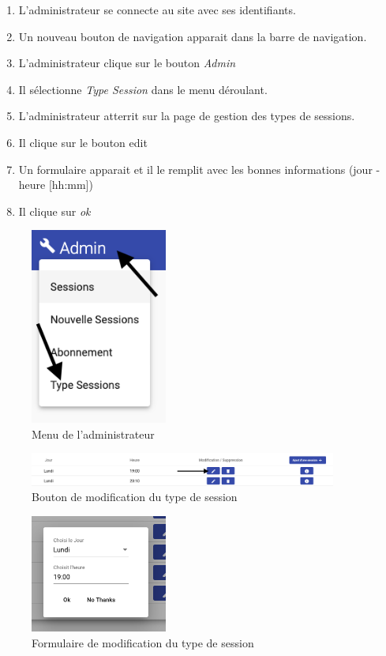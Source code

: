 \begin{enumerate}
	\item L'administrateur se connecte au site avec ses identifiants. 
	\item Un nouveau bouton de navigation apparait dans la barre de navigation. 
	\item L'administrateur clique sur le bouton \textit{Admin}
	\item Il sélectionne \textit{Type Session} dans le menu déroulant. 
	\item L'administrateur atterrit sur la page de gestion des types de sessions. 
	\item Il clique sur le bouton edit
	\item Un formulaire apparait et il le remplit avec les bonnes informations (jour - heure [hh:mm])
	\item Il clique sur \textit{ok} 
\end{enumerate}

\vspace{\baselineskip}
\begin{figure}[h]
	\includegraphics[width=0.4\textwidth,center]{Figures/us13-1}
	\caption{Menu de l'administrateur}
\end{figure}

\newpage
\begin{figure}[h]
	\includegraphics[width=0.9\textwidth,center]{Figures/us13-2}
	\caption{Bouton de modification du type de session}
\end{figure}

\vspace{\baselineskip}
\begin{figure}[h]
	\includegraphics[width=0.4\textwidth,center]{Figures/us13-3}
	\caption{Formulaire de modification du type de session}
\end{figure}

